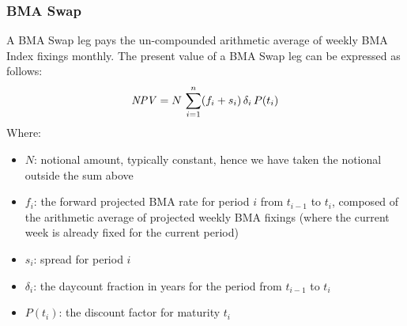 \subsubsection{BMA Swap}
\label{pricing:ir_bma}

A BMA Swap leg pays the un-compounded arithmetic average of weekly BMA Index fixings 
monthly. The present value of a BMA Swap leg can be expressed as follows:
$$
\mathit{NPV}= N \,\sum_{i=1}^n (f_i + s_i)\, \delta_i \,P(t_i)
$$
Where:
\begin{itemize}
\item $N$: notional amount, typically constant, hence we have taken the notional 
outside the sum above 
\item $f_i$: the forward projected BMA rate for period $i$ from $t_{i-1}$ to $t_i$, 
composed of the arithmetic average of projected weekly BMA fixings (where the 
current week is already fixed for the current period)
\item $s_i$: spread for period $i$
\item $\delta_i$: the daycount fraction in years for the period from $t_{i-1}$ to $t_i$
\item $P(t_i)$: the discount factor for maturity $t_i$
\end{itemize}
